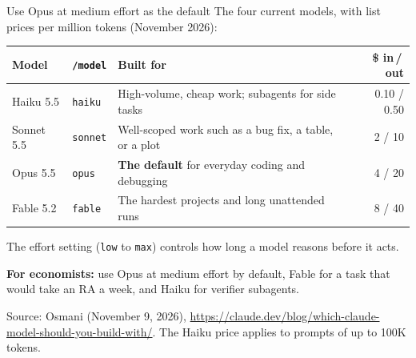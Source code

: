 \documentclass[aspectratio=169,10pt]{beamer}
\newcommand{\emphc}[1]{\textcolor{harvardcrimson}{#1}}
\begin{document}
\begin{frame}[fragile]{Use Opus at medium effort as the default}
The four current models, with list prices per million tokens (November 2026):
\begin{center}
\small
\renewcommand{\arraystretch}{1.3}
\begin{tabular}{@{}ll>{\raggedright\arraybackslash}p{6.6cm}r@{}}
\toprule
\textbf{Model} & \texttt{/model} & \textbf{Built for} & \textbf{\$ in\,/\,out} \\
\midrule
Haiku 5.5 & \texttt{haiku} & High-volume, cheap work; subagents for side tasks & 0.10 / 0.50 \\
Sonnet 5.5 & \texttt{sonnet} & Well-scoped work such as a bug fix, a table, or a plot & 2 / 10 \\
Opus 5.5 & \texttt{opus} & \textbf{The default} for everyday coding and debugging & 4 / 20 \\
Fable 5.2 & \texttt{fable} & The hardest projects and long unattended runs & 8 / 40 \\
\bottomrule
\end{tabular}
\end{center}

\vspace{0.3em}
The \emphc{effort} setting (\texttt{low} to \texttt{max}) controls how long a model reasons before it acts.

\vspace{0.5em}
\textbf{For economists:} use Opus at medium effort by default, Fable for a task that would take an RA a week, and Haiku for verifier subagents.

\vspace{0.6em}
{\scriptsize\textcolor{uzhgreydark}{Source: Osmani (November 9, 2026), \url{https://claude.dev/blog/which-claude-model-should-you-build-with/}. The Haiku price applies to prompts of up to 100K tokens.}}
\end{frame}
\end{document}

